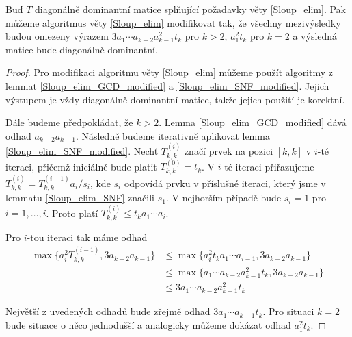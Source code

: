 \begin{lem} \label{Sloup_elim_modified}
Buď $ T $ diagonálně dominantní matice splňující požadavky věty \ref{Sloup_elim}.
Pak můžeme algoritmus věty \ref{Sloup_elim} modifikovat tak, že všechny
mezivýsledky budou omezeny výrazem $ 3 a_1 \cdots a_{k - 2} a_{k - 1}^2 t_k $ 
pro $ k > 2 $, $ a_1^2 t_k $ pro $ k = 2 $ a výsledná matice bude diagonálně 
dominantní.
\end{lem}
\begin{proof}
Pro modifikaci algoritmu věty \ref{Sloup_elim} můžeme použít algoritmy z lemmat
\ref{Sloup_elim_GCD_modified} a \ref{Sloup_elim_SNF_modified}. Jejich výstupem
je vždy diagonálně dominantní matice, takže jejich použití je korektní.

Dále budeme předpokládat, že $ k > 2 $.
Lemma \ref{Sloup_elim_GCD_modified} dává odhad $ a_{k - 2} a_{k - 1} $. 
Následně budeme iterativně aplikovat lemma \ref{Sloup_elim_SNF_modified}.
Nechť $ T_{k,k}^{(i)} $ značí prvek na pozici $ [k, k] $ v $ i $-té iteraci, 
přičemž iniciálně bude platit $ T_{k,k}^{(0)} = t_k $. V $ i $-té 
iteraci přiřazujeme $ T_{k,k}^{(i)} = T_{k,k}^{(i - 1)} a_i / s_i $, 
kde $ s_i $ odpovídá prvku v příslušné iteraci, který jsme v lemmatu 
\ref{Sloup_elim_SNF} značili $ s_1 $.
V nejhorším případě bude $ s_i = 1 $ pro $ i = 1, \dots, i $. Proto platí 
$ T_{k,k}^{(i)} \leq t_k a_1 \cdots a_i $. 

Pro $ i $-tou iteraci tak máme odhad 
\begin{align*}
\max\{ a_i^2 T_{k,k}^{(i - 1)}, 3 a_{k - 2} a_{k - 1} \} 
    & \leq \max\{ a_i^2 t_k a_1 \cdots a_{i - 1} , 3 a_{k - 2} a_{k - 1} \} \\
    & \leq \max\{ a_1 \cdots a_{k - 2} a_{k - 1}^2 t_k, 3 a_{k - 2} a_{k - 1} \} \\
    & \leq 3 a_1 \cdots a_{k - 2} a_{k - 1}^2 t_k
\end{align*}

Největší z uvedených odhadů bude zřejmě odhad $ 3 a_1 \cdots a_{k - 1} t_k $.
Pro situaci $ k = 2 $ bude situace o něco jednodušší a analogicky můžeme dokázat
odhad $ a_1^2 t_k $.
\end{proof}


